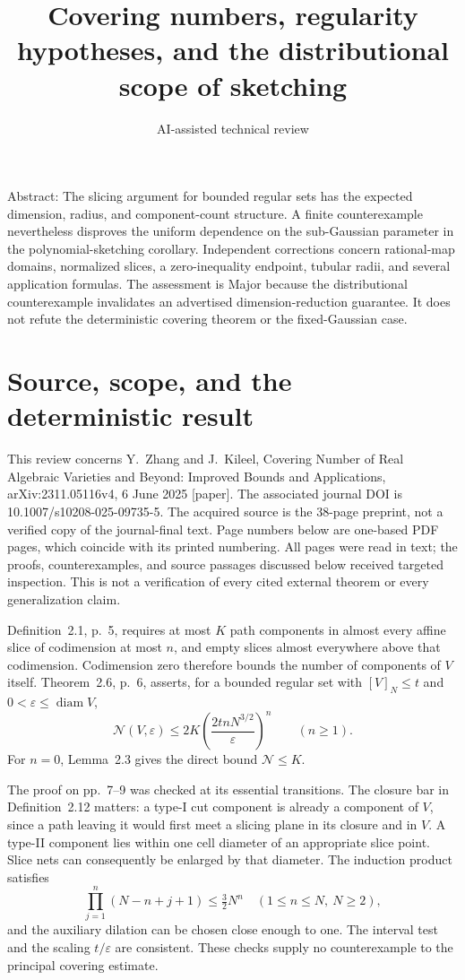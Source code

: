 \documentclass[10pt]{article}
\title{Covering numbers, regularity hypotheses, and the distributional scope of sketching}
\author{AI-assisted technical review}
\date{}
\begin{document}
\maketitle
Abstract: The slicing argument for bounded regular sets has the expected dimension, radius, and component-count structure. A finite counterexample nevertheless disproves the uniform dependence on the sub-Gaussian parameter in the polynomial-sketching corollary. Independent corrections concern rational-map domains, normalized slices, a zero-inequality endpoint, tubular radii, and several application formulas. The assessment is Major because the distributional counterexample invalidates an advertised dimension-reduction guarantee. It does not refute the deterministic covering theorem or the fixed-Gaussian case.\par
\section*{Source, scope, and the deterministic result}
This review concerns Y. Zhang and J. Kileel, Covering Number of Real Algebraic Varieties and Beyond: Improved Bounds and Applications, arXiv:2311.05116v4, 6 June 2025 [paper]. The associated journal DOI is 10.1007/s10208-025-09735-5. The acquired source is the 38-page preprint, not a verified copy of the journal-final text. Page numbers below are one-based PDF pages, which coincide with its printed numbering. All pages were read in text; the proofs, counterexamples, and source passages discussed below received targeted inspection. This is not a verification of every cited external theorem or every generalization claim.\par
Definition 2.1, p. 5, requires at most \(K\) path components in almost every affine slice of codimension at most \(n\), and empty slices almost everywhere above that codimension. Codimension zero therefore bounds the number of components of \(V\) itself. Theorem 2.6, p. 6, asserts, for a bounded regular set with \([V]_N\le t\) and \(0<\varepsilon\le\operatorname{diam}V\), \[\mathcal N(V,\varepsilon)
 \le 2K\left(\frac{2tnN^{3/2}}{\varepsilon}\right)^n
 \qquad (n\ge1).\] For \(n=0\), Lemma 2.3 gives the direct bound \(\mathcal N\le K\).\par
The proof on pp. 7–9 was checked at its essential transitions. The closure bar in Definition 2.12 matters: a type-I cut component is already a component of \(V\), since a path leaving it would first meet a slicing plane in its closure and in \(V\). A type-II component lies within one cell diameter of an appropriate slice point. Slice nets can consequently be enlarged by that diameter. The induction product satisfies \[\prod_{j=1}^{n}(N-n+j+1)\le \tfrac32N^n
 \quad(1\le n\le N,\ N\ge2),\] and the auxiliary dilation can be chosen close enough to one. The interval test and the scaling \(t/\varepsilon\) are consistent. These checks supply no counterexample to the principal covering estimate.\par
\end{document}
